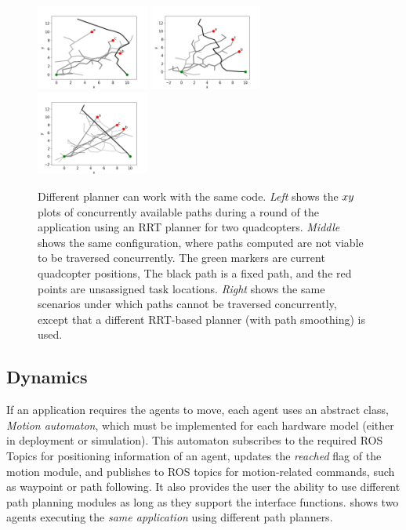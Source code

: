 \begin{figure}[!htbp]
\centering
 \begin{minipage}[b]{\textwidth}
    \includegraphics[width=0.33\textwidth]{figs/nonconflict.png}
    \includegraphics[width=0.33\textwidth]{figs/conflict.png}
    \includegraphics[width=0.33\textwidth]{figs/rrt_with_smoothing.png}
     \caption{\small Different planner can work with the same code. \emph{Left} shows the $x\-y$ plots of concurrently available paths  during a round of the \Task application using an RRT planner for two quadcopters. \emph{Middle} shows the same configuration, where paths computed are not viable to be traversed concurrently. The green markers are current quadcopter positions, The black path is a fixed path, and the red points are unsassigned task locations. \emph{Right} shows the same scenarios under which paths cannot be traversed concurrently, except that a different RRT-based planner (with path smoothing) is used.\vspace{-2mm}}
    \label{fig:pathplanners}
  \end{minipage}
\end{figure}



\subsection{Dynamics}
If an application requires the agents to move, each agent uses an abstract class, \emph{Motion automaton}, which must be implemented for each hardware model (either in deployment or simulation).
This automaton subscribes to the required ROS Topics for positioning information of an agent, updates the \emph{reached} flag of the motion module, and publishes to ROS topics for motion-related commands, such as waypoint or path following. It also provides the user the ability to use different path planning modules as long as they support the interface functions.  shows two agents executing the \emph{same application} using different path planners.\vspace{-1mm}

